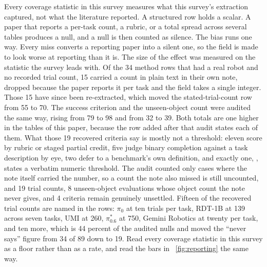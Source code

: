 Every coverage statistic in this survey measures what this survey's extraction captured, not what
the literature reported. A structured row holds a scalar. A paper that reports a per-task count, a
rubric, or a total spread across several tables produces a null, and a null is then counted as
silence. The bias runs one way. Every miss converts a reporting paper into a silent one, so the
field is made to look worse at reporting than it is. The size of the effect was measured on the
statistic the survey leads with. Of the 34 method rows that had a real robot and no recorded trial
count, 15 carried a count in plain text in their own note, dropped because the paper reports it
per task and the field takes a single integer. Those 15 have since been re-extracted, which moved
the stated-trial-count row from 55 to 70. The success criterion and the unseen-object count were
audited the same way, rising from 79 to 98 and from 32 to 39. Both totals are one higher in the
tables of this paper, because the row added after that audit states each of them. What those 19
recovered criteria say is mostly not a threshold: eleven score by rubric or staged partial credit, five judge binary
completion against a task description by eye, two defer to a benchmark's own definition, and
exactly one, \cite{pistar06_2025}, states a verbatim numeric threshold. The audit counted only
cases where the note itself carried the number, so a count the note also missed is still uncounted,
and 19 trial counts, 8 unseen-object evaluations whose object count the note never gives, and 4
criteria remain genuinely unsettled. Fifteen of the recovered trial counts are named in the rows:
$\pi_0$ \cite{pi0_2024} at ten trials per task, RDT-1B \cite{rdt1b_2024} at 139 across seven
tasks, UMI \cite{umi_2024} at 260, $\pi^{*}_{0.6}$ \cite{pistar06_2025} at 750, Gemini Robotics
\cite{gemini_robotics_2025} at twenty per task, and ten more, which is 44 percent of the audited
nulls and moved the ``never says'' figure from 34 of 89 down to 19. Read
every coverage statistic in this survey as a floor rather than as a rate, and read the bars in
\figurename~\ref{fig:reporting} the same way.

